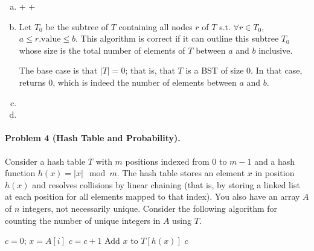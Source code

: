 \documentclass[11pt]{article}
\begin{document}
\begin{enumerate}[(a)]
	\item \begin{algorithmic}[1]
                \State {}
            \EndIf
                \State {} +  + 
                \State \Return {}
            \Else
                \State \Return {}
            \EndIf
        \EndProcedure
	\end{algorithmic}
	\item Let $T_0$ be the subtree of $T$ containing all nodes $r$ of $T$ s.t. $\forall r \in T_0$, $a \leq r.\text{value} \leq b$. This algorithm is correct if it can outline this subtree $T_0$ whose size is the total number of elements of $T$ between $a$ and $b$ inclusive. \vsp
 
    The base case is that $|T| = 0$; that is, that $T$ is a BST of size 0. In that case,  returns 0, which is indeed the number of elements between $a$ and $b$.\vsp

    
	\item
	\item
\end{enumerate}



\newpage
\paragraph{Problem 4 (Hash Table and Probability).}
Consider a hash table $T$ with $m$ positions indexed from $0$ to $m-1$ and a hash function $h(x) = |x| \mod m$. The hash table stores an element $x$ in position $h(x)$ and resolves collisions by linear chaining (that is, by storing a linked list at each position for all elements mapped to that index). You also have an array $A$ of $n$ integers, not necessarily unique. Consider the following algorithm for counting the number of unique integers in $A$ using $T$.

\begin{algorithmic}[1]
    \State $c = 0$;
        \State $x = A[i]$
            \State $c = c + 1$
            \State Add $x$ to $T[h(x)]$
        \EndIf
    \EndFor
    \State \Return $c$
\EndProcedure
\end{algorithmic}
\end{document}
